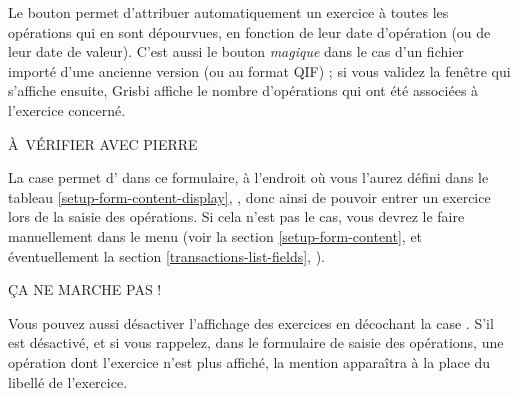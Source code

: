 Le bouton  permet d'attribuer automatiquement un exercice à toutes les opérations qui en sont dépourvues, en fonction de leur date d'opération (ou de leur date de valeur). C'est aussi le bouton \emph{magique} dans le cas d'un fichier importé d'une ancienne version (ou au format QIF) ; si vous validez la fenêtre qui s'affiche ensuite, Grisbi affiche le nombre d'opérations qui ont été associées à l'exercice concerné.


À VÉRIFIER AVEC PIERRE






La case  permet d' dans ce formulaire, à l'endroit où vous l'aurez défini dans le tableau \vref{setup-form-content-display}, , donc ainsi de pouvoir entrer un exercice lors de la saisie des opérations. Si cela n'est pas le cas, vous devrez le faire manuellement dans le menu  (voir la section \vref{setup-form-content},  et éventuellement la section \vref{transactions-list-fields}, ).

ÇA NE MARCHE PAS !

Vous pouvez aussi désactiver l'affichage des exercices en décochant la case .
S'il est désactivé, et si vous rappelez, dans le formulaire de saisie des opérations, une opération dont l'exercice n'est plus affiché, la mention  apparaîtra à la place du libellé de l'exercice.

